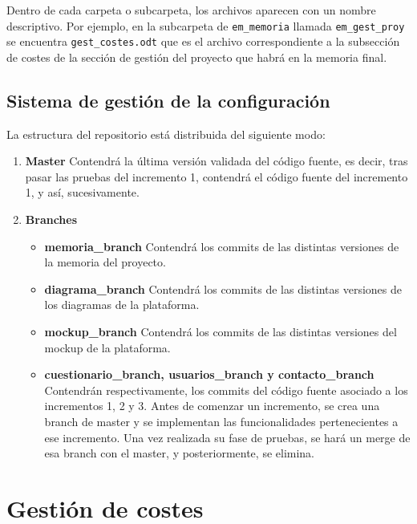 Dentro de cada carpeta o subcarpeta, los archivos aparecen con un nombre descriptivo. Por ejemplo, en la subcarpeta de \texttt{em\_memoria} llamada \texttt{em\_gest\_proy} se encuentra \texttt{gest\_costes.odt} que es el archivo correspondiente a la subsección de costes de la sección de gestión del proyecto que habrá en la memoria final.

\subsection{Sistema de gestión de la configuración}
La estructura del repositorio está distribuida del siguiente modo:

\begin{enumerate}
\item \textbf{Master}
Contendrá la última versión validada del código fuente, es decir, tras pasar las pruebas del incremento 1, contendrá el código fuente del incremento 1, y así, sucesivamente.
\item \textbf{Branches}
	\begin{itemize}
	\item \textbf{memoria\_branch}
	Contendrá los commits de las distintas versiones de la memoria del proyecto.
	\item \textbf{diagrama\_branch}
	Contendrá los commits de las distintas versiones de los diagramas de la plataforma.
	\item \textbf{mockup\_branch}
	Contendrá los commits de las distintas versiones del mockup de la plataforma.
	\item \textbf{cuestionario\_branch, usuarios\_branch y contacto\_branch}
	Contendrán respectivamente, los commits del código fuente asociado a los incrementos 1, 2 y 3.
	Antes de comenzar un incremento, se crea una branch de master y se implementan las funcionalidades pertenecientes a ese incremento. Una vez realizada su fase de pruebas, se hará un merge de esa branch con el master, y posteriormente, se elimina.
	\end{itemize}
\end{enumerate}



\section{Gestión de costes}

